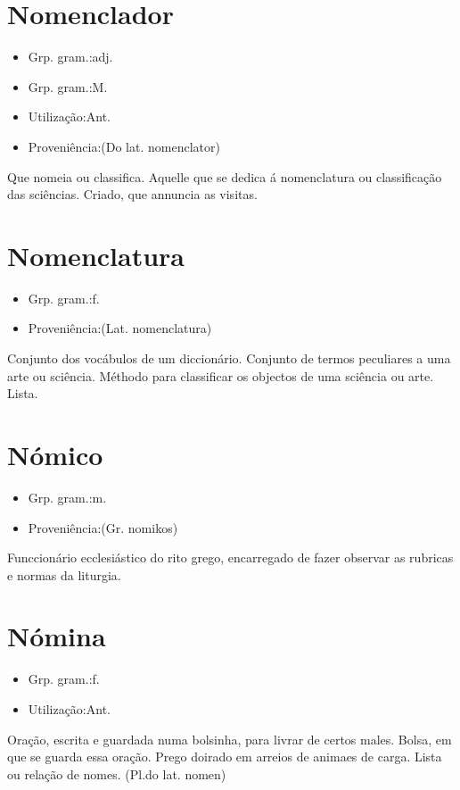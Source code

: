 \section{Nomenclador}
\begin{itemize}
\item {Grp. gram.:adj.}
\end{itemize}
\begin{itemize}
\item {Grp. gram.:M.}
\end{itemize}
\begin{itemize}
\item {Utilização:Ant.}
\end{itemize}
\begin{itemize}
\item {Proveniência:(Do lat. \textunderscore nomenclator\textunderscore )}
\end{itemize}
Que nomeia ou classifica.
Aquelle que se dedica á nomenclatura ou classificação das sciências.
Criado, que annuncia as visitas.
\section{Nomenclatura}
\begin{itemize}
\item {Grp. gram.:f.}
\end{itemize}
\begin{itemize}
\item {Proveniência:(Lat. \textunderscore nomenclatura\textunderscore )}
\end{itemize}
Conjunto dos vocábulos de um diccionário.
Conjunto de termos peculiares a uma arte ou sciência.
Méthodo para classificar os objectos de uma sciência ou arte.
Lista.
\section{Nómico}
\begin{itemize}
\item {Grp. gram.:m.}
\end{itemize}
\begin{itemize}
\item {Proveniência:(Gr. \textunderscore nomikos\textunderscore )}
\end{itemize}
Funccionário ecclesiástico do rito grego, encarregado de fazer observar as rubricas e normas da liturgia.
\section{Nómina}
\begin{itemize}
\item {Grp. gram.:f.}
\end{itemize}
\begin{itemize}
\item {Utilização:Ant.}
\end{itemize}
Oração, escrita e guardada numa bolsinha, para livrar de certos males.
Bolsa, em que se guarda essa oração.
Prego doirado em arreios de animaes de carga.
Lista ou relação de nomes.
(\textunderscore Pl.\textunderscore  do lat. \textunderscore nomen\textunderscore )
